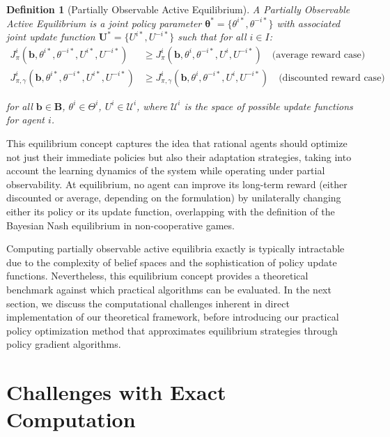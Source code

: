 \documentclass[a4paper,12pt]{report}
\newtheorem{definition}{Definition}
\begin{document}
\begin{definition}[Partially Observable Active Equilibrium]
    A Partially Observable Active Equilibrium is a joint policy parameter $\boldsymbol{\theta}^* = \{\theta^{i*}, \theta^{-i*}\}$ with associated joint update function $\boldsymbol{U}^* = \{U^{i*}, U^{-i*}\}$ such that for all $i \in I$:
    \begin{align}
        J^i_{\pi}(\boldsymbol{b}, \theta^{i*}, \theta^{-i*}, U^{i*}, U^{-i*})         & \geq J^i_{\pi}(\boldsymbol{b}, \theta^i, \theta^{-i*}, U^i, U^{-i*}) \quad \text{(average reward case)}              \\
        J^i_{\pi, \gamma}(\boldsymbol{b}, \theta^{i*}, \theta^{-i*}, U^{i*}, U^{-i*}) & \geq J^{i}_{\pi, \gamma}(\boldsymbol{b}, \theta^i, \theta^{-i*}, U^i, U^{-i*}) \quad \text{(discounted reward case)}
    \end{align}

    for all $\boldsymbol{b} \in \boldsymbol{B}$, $\theta^i \in \Theta^i$, $U^i \in \mathcal{U}^i$, where $\mathcal{U}^i$ is the space of possible update functions for agent $i$.
\end{definition}

This equilibrium concept captures the idea that rational agents should optimize not just their immediate policies but also their adaptation strategies, taking into account the learning dynamics of the system while operating under partial observability. At equilibrium, no agent can improve its long-term reward (either discounted or average, depending on the formulation) by unilaterally changing either its policy or its update function, overlapping with the definition of the Bayesian Nash equilibrium in non-cooperative games.

Computing partially observable active equilibria exactly is typically intractable due to the complexity of belief spaces and the sophistication of policy update functions. Nevertheless, this equilibrium concept provides a theoretical benchmark against which practical algorithms can be evaluated. In the next section, we discuss the computational challenges inherent in direct implementation of our theoretical framework, before introducing our practical policy optimization method that approximates equilibrium strategies through policy gradient algorithms.

\section{Challenges with Exact Computation}
\end{document}

